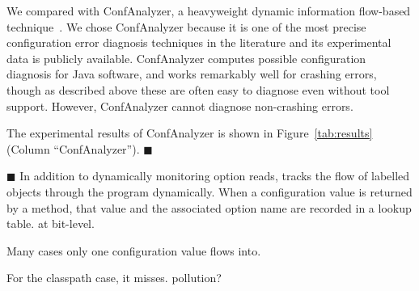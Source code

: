 We compared \ourtool with ConfAnalyzer, a heavyweight dynamic information
flow-based technique~\cite{Rabkin:2011:PPC}.
We chose ConfAnalyzer because it is one of the most precise configuration
error diagnosis techniques in the literature and its 
experimental data is publicly available.
ConfAnalyzer computes possible configuration diagnosis for Java software,
and works remarkably well for crashing errors, though as
described above these are often easy to diagnose even without tool
support. However, ConfAnalyzer cannot diagnose non-crashing errors.

The experimental results of ConfAnalyzer is shown in Figure~\ref{tab:results} (Column ``ConfAnalyzer'').
$\blacksquare$

$\blacksquare$
In addition to dynamically monitoring
option reads, \ourtool tracks the flow of labelled objects through the
program dynamically. When a configuration value is returned
by a method, that value and the associated option name are
recorded in a lookup table. at bit-level.

Many cases only one configuration value flows into.

For the classpath case, it misses. pollution?




